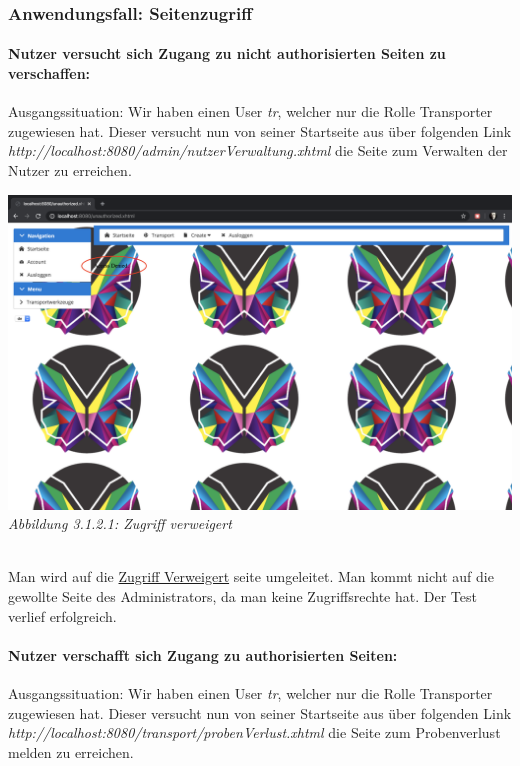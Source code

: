 \documentclass[enabledeprecatedfontcommands,fontsize=12pt,paper=a4,twoside]{scrartcl}
\begin{document}

\subsubsection{Anwendungsfall: Seitenzugriff}

%
\paragraph{Nutzer versucht sich Zugang zu nicht authorisierten Seiten zu verschaffen:}

Ausgangssituation: Wir haben einen User \textit{tr}, welcher nur die Rolle Transporter zugewiesen hat. Dieser versucht nun von seiner Startseite aus über folgenden Link \textit{http://localhost:8080/admin/nutzerVerwaltung.xhtml} die Seite zum Verwalten der Nutzer zu erreichen. 

\hypertarget{sc3.1.2.1.1}{
\includegraphics[width=1\textwidth]{Screenshots/3121.png}
\textit{Abbildung 3.1.2.1: Zugriff verweigert}
} \\

Man wird auf die \hyperlink{sc3.1.2.1.1}{Zugriff Verweigert} seite umgeleitet. Man kommt nicht auf die gewollte Seite des Administrators, da man keine Zugriffsrechte hat. 
Der Test verlief erfolgreich.

%
\paragraph{Nutzer verschafft sich Zugang zu authorisierten Seiten:}

Ausgangssituation: Wir haben einen User \textit{tr}, welcher nur die Rolle Transporter zugewiesen hat. Dieser versucht nun von seiner Startseite aus über folgenden Link \textit{http://localhost:8080/transport/probenVerlust.xhtml} die Seite zum Probenverlust melden zu erreichen. 
\end{document}
